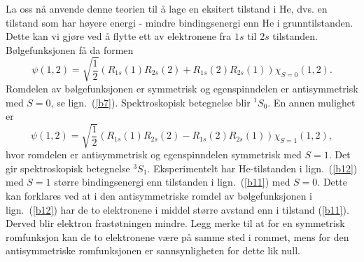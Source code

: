 La oss n{\aa} anvende denne teorien til {\aa} lage en eksitert tilstand
i He, dvs. en tilstand som har h{\o}yere energi - mindre
bindingsenergi enn He i grunntilstanden. Dette kan vi gj{\o}re
ved {\aa} flytte ett av elektronene fra $1s$ til
$2s$ tilstanden. B{\o}lgefunksjonen f{\aa} da formen
%
\begin{equation}
\psi(1, 2) = \sqrt{\frac{1}{2}}
\left ( R_{1s}(1) R_{2s}(2) + R_{1s}(2) R_{2s}(1) \right )
\chi_{S = 0}(1,2).
\label{b11}
\end{equation}
%
Romdelen av b{\o}lgefunksjonen er symmetrisk og egenspinndelen
er antisymmetrisk med $ S = 0$, se  lign.~(\ref{b7}). Spektroskopisk
betegnelse blir $^{1}S_0$. En annen mulighet er
\begin{equation}
\psi(1, 2) = \sqrt{\frac{1}{2}}
\left ( R_{1s}(1) R_{2s}(2) - R_{1s}(2) R_{2s}(1) \right )
\chi_{S = 1}(1,2),
\label{b12}
\end{equation}
%
hvor romdelen er antisymmetrisk og egenspinndelen symmetrisk
med $S = 1$. Det gir spektroskopisk betegnelse
$^{3}S_1$. Eksperimentelt har He-tilstanden i lign.~(\ref{b12}) med $S = 1$
st{\o}rre bindingsenergi enn tilstanden i lign.~(\ref{b11}) med $S = 0$.
Dette kan forklares ved at i den antisymmetriske romdel av
b{\o}lgefunksjonen i lign.~(\ref{b12}) har de to elektronene i middel
st{\o}rre avstand enn i tilstand (\ref{b11}). Derved blir elektron
frast{\o}tningen mindre.
Legg merke til at for en symmetrisk romfunksjon kan de to elektronene
v{\ae}re p{\aa} samme sted i rommet, mens for den antisymmetriske
romfunksjonen er sannsynligheten for dette lik null.
%

